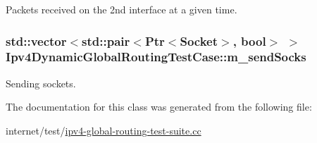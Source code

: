 Packets received on the 2nd interface at a given time. 

\subsubsection[{\texorpdfstring{m\+\_\+send\+Socks}{m_sendSocks}}]{\setlength{\rightskip}{0pt plus 5cm}std\+::vector$<$std\+::pair$<${\bf Ptr}$<${\bf Socket}$>$, bool$>$ $>$ Ipv4\+Dynamic\+Global\+Routing\+Test\+Case\+::m\+\_\+send\+Socks\hspace{0.3cm}{\ttfamily [private]}}\hypertarget{classIpv4DynamicGlobalRoutingTestCase_ab5c3600b2f8c2e1fa3b91977e7d4a3d0}{}\label{classIpv4DynamicGlobalRoutingTestCase_ab5c3600b2f8c2e1fa3b91977e7d4a3d0}


Sending sockets. 



The documentation for this class was generated from the following file\+:\begin{DoxyCompactItemize}
\item 
internet/test/\hyperlink{ipv4-global-routing-test-suite_8cc}{ipv4-\/global-\/routing-\/test-\/suite.\+cc}\end{DoxyCompactItemize}
